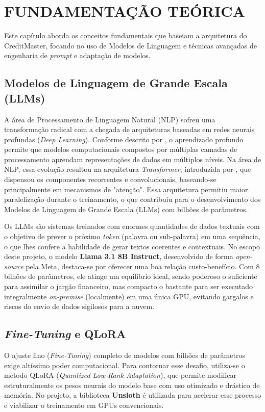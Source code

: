 \chapter{FUNDAMENTAÇÃO TEÓRICA}

Este capítulo aborda os conceitos fundamentais que baseiam a arquitetura do CreditMaster, focando no uso de Modelos de Linguagem e técnicas avançadas de engenharia de \textit{prompt} e adaptação de modelos.

\section{Modelos de Linguagem de Grande Escala (LLMs)}

A área de Processamento de Linguagem Natural (NLP) sofreu uma transformação radical com a chegada de arquiteturas baseadas em redes neurais profundas (\textit{Deep Learning}). Conforme descrito por , o aprendizado profundo permite que modelos computacionais compostos por múltiplas camadas de processamento aprendam representações de dados em múltiplos níveis. Na área de NLP, essa evolução resultou na arquitetura \textit{Transformer}, introduzida por , que dispensou os componentes recorrentes e convolucionais, baseando-se principalmente em mecanismos de "atenção". Essa arquitetura permitiu maior paralelização durante o treinamento, o que contribuiu para o desenvolvimento dos Modelos de Linguagem de Grande Escala (LLMs) com bilhões de parâmetros.

Os LLMs são sistemas treinados com enormes quantidades de dados textuais com o objetivo de prever o próximo \textit{token} (palavra ou sub-palavra) em uma sequência, o que lhes confere a habilidade de gerar textos coerentes e contextuais. No escopo deste projeto, o modelo \textbf{Llama 3.1 8B Instruct}, desenvolvido de forma \textit{open-source} pela Meta, destaca-se por oferecer uma boa relação custo-benefício. Com 8 bilhões de parâmetros, ele atinge um equilíbrio ideal, sendo poderoso o suficiente para assimilar o jargão financeiro, mas compacto o bastante para ser executado integralmente \textit{on-premise} (localmente) em uma única GPU, evitando gargalos e riscos do envio de dados sigilosos para a nuvem.

\section{\textit{Fine-Tuning} e QLoRA}
O ajuste fino (\textit{Fine-Tuning}) completo de modelos com bilhões de parâmetros exige altíssimo poder computacional. Para contornar esse desafio, utiliza-se o método QLoRA (\textit{Quantized Low-Rank Adaptation}), que permite modificar estruturalmente os pesos neurais do modelo base com uso otimizado e drástico de memória. No projeto, a biblioteca \textbf{Unsloth} é utilizada para acelerar esse processo e viabilizar o treinamento em GPUs convencionais.

